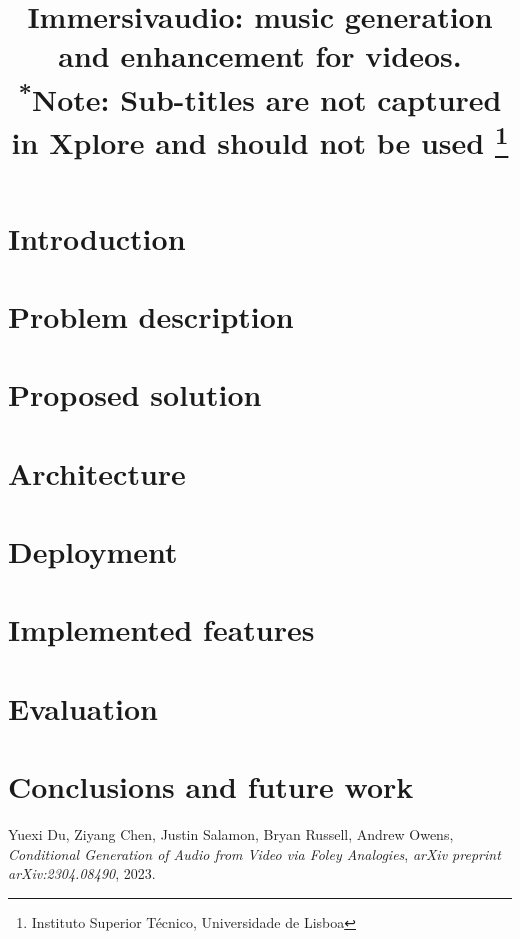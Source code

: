 \documentclass[conference]{IEEEtran}
\begin{document}
\title{Immersivaudio: music generation and enhancement for videos.\\
{\footnotesize \textsuperscript{*}Note: Sub-titles are not captured in Xplore and
should not be used}
\thanks{Instituto Superior Técnico, Universidade de Lisboa}
}

\author{
\and
{}
\and
{}
}

\maketitle

\section{Introduction}

\section{Problem description}

\section{Proposed solution}

\section{Architecture}

\section{Deployment}

\section{Implemented features}

\section{Evaluation}

\section{Conclusions and future work}


\begin{thebibliography}{00}
    Yuexi Du, Ziyang Chen, Justin Salamon, Bryan Russell, Andrew Owens,
    \emph{Conditional Generation of Audio from Video via Foley Analogies},
    \emph{arXiv preprint arXiv:2304.08490},
    2023.
\end{thebibliography}
\end{document}
